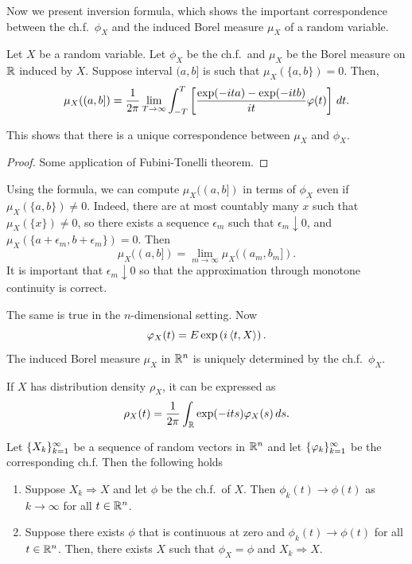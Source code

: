 \documentclass[a4paper]{article}
\newcommand{\convd}{\Rightarrow}
\begin{document}
Now we present inversion formula, which shows the important correspondence
between the ch.f.\ $\phi_X$ and the induced Borel measure $\mu_X$
of a random variable.

\begin{thm}
  Let $X$ be a random variable. Let $\phi_X$ be the ch.f.\ and $\mu_X$
  be the Borel measure on $\mathbb{R}$ induced by $X$. Suppose interval $(a, b]$
  is such that $\mu_X (\{ a, b \}) = 0$. Then,
  \[
    \mu_X ((a, b]) =
    \frac{1}{2 \pi} \lim_{T \to \infty}
    \int_{-T}^T \left[ \frac{\exp (- i t a) - \exp (- i t b)}{i t} \varphi
      (t) \right] \, d t.
  \]

  This shows that there is a unique correspondence between $\mu_X$ and
  $\phi_X$.
\end{thm}

\begin{proof}
  Some application of Fubini-Tonelli theorem.
\end{proof}

\begin{remark}
  Using the formula, we can compute $\mu_X ((a, b])$ in terms of
  $\phi_X$ even if $\mu_X (\{a, b\}) \neq 0$.
  Indeed, there are at most countably many $x$ such that $\mu_X (\{x\})
    \neq 0$, so there exists a sequence $\epsilon_m$ such that
  $\epsilon_m \downarrow 0$, and $\mu_X (\{a + \epsilon_m, b + \epsilon_m\})
    = 0$. Then
  \[
    \mu_X ((a, b]) = \lim_{m \to \infty} \mu_X ((a_m, b_m]).
  \]
  It is important that $\epsilon_m \downarrow 0$ so that the
  approximation through monotone continuity is correct.
\end{remark}

The same is true in the $n$-dimensional setting. Now
\[
  \varphi_X (t) = E \exp \left( i \left\langle t, X \right\rangle \right).
\]
The induced Borel measure $\mu_X$ in $\mathbb{R}^n$ is uniquely determined by the
ch.f.\ $\phi_X$.

\begin{thm}
  If $X$ has distribution density $\rho_X$, it can be expressed
  as
  \[
    \rho_X (t) = \frac{1}{2\pi} \int_{\mathbb{R}} \exp (- i t s) \varphi_X (s) \, d s.
  \]
\end{thm}

\begin{thm}[Levy]
  Let $\{ X_k \}_{k=1}^\infty$ be a sequence of random vectors in $\mathbb{R}^n$ and
  let $\{ \varphi_k \}_{k=1}^\infty$ be the corresponding ch.f. Then the following
  holds
  \begin{enumerate}
    \item Suppose $X_k \convd X$ and let $\phi$ be the ch.f.\ of $X$.
          Then $\phi_k (t) \to \phi(t)$ as $k \to \infty$ for all $t \in \mathbb{R}^n$.

    \item Suppose there exists $\phi$ that is continuous at zero and
          $\phi_k(t) \to \phi(t)$ for all $t \in \mathbb{R}^n$. Then, there exists $X$
          such that $\phi_X = \phi$ and $X_k \convd X$.
  \end{enumerate}
\end{thm}
\end{document}
